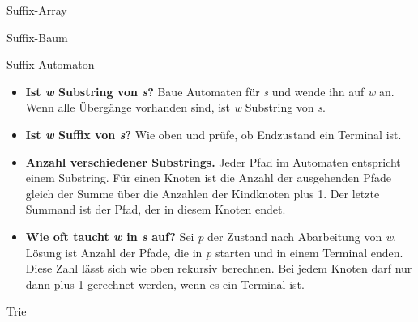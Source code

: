 \begin{algorithm}{Suffix-Array}
\begin{methods}
\end{methods}
\end{algorithm}

\begin{algorithm}{Suffix-Baum}
	\begin{methods}
	\end{methods}
\end{algorithm}

\begin{algorithm}{Suffix-Automaton}
	\begin{itemize}
		\item \textbf{Ist \textit{w} Substring von \textit{s}?}
		Baue Automaten für \textit{s} und wende ihn auf \textit{w} an.
		Wenn alle Übergänge vorhanden sind, ist \textit{w} Substring von \textit{s}.
	
		\item \textbf{Ist \textit{w} Suffix von \textit{s}?}
		Wie oben und prüfe, ob Endzustand ein Terminal ist.
	
		\item \textbf{Anzahl verschiedener Substrings.}
		Jeder Pfad im Automaten entspricht einem Substring.
		Für einen Knoten ist die Anzahl der ausgehenden Pfade gleich der Summe über die Anzahlen der Kindknoten plus 1.
		Der letzte Summand ist der Pfad, der in diesem Knoten endet.
	
		\item \textbf{Wie oft taucht \textit{w} in \textit{s} auf?}
		Sei \textit{p} der Zustand nach Abarbeitung von \textit{w}.
		Lösung ist Anzahl der Pfade, die in \textit{p} starten und in einem Terminal enden.
		Diese Zahl lässt sich wie oben rekursiv berechnen.
		Bei jedem Knoten darf nur dann plus 1 gerechnet werden, wenn es ein Terminal ist.
	\end{itemize}
\end{algorithm}

\begin{algorithm}{Trie}
\end{algorithm}
